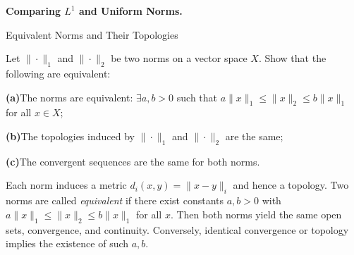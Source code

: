 \begin{problem}[CP-II-0075]
\label{prob:cp-ii-0075}
\textbf{Comparing \(L^1\) and Uniform Norms.}

\hspace*{1.5em}Equivalent Norms and Their Topologies

Let $\|\cdot\|_1$ and $\|\cdot\|_2$ be two norms on a vector space $X$.
Show that the following are equivalent:

	\par\smallskip\noindent\textbf{(a)}\quad The norms are equivalent: $\exists a,b>0$ such that $a\|x\|_1\le\|x\|_2\le b\|x\|_1$ for all $x\in X$;
	\par\smallskip\noindent\textbf{(b)}\quad The topologies induced by $\|\cdot\|_1$ and $\|\cdot\|_2$ are the same;
	\par\smallskip\noindent\textbf{(c)}\quad The convergent sequences are the same for both norms.

Each norm induces a metric $d_i(x,y)=\|x-y\|_i$ and hence a topology.
Two norms are called \emph{equivalent} if there exist constants $a,b>0$
with $a\|x\|_1\le\|x\|_2\le b\|x\|_1$ for all $x$.
Then both norms yield the same open sets, convergence, and continuity.
Conversely, identical convergence or topology implies the existence of such $a,b$.
\end{problem}

